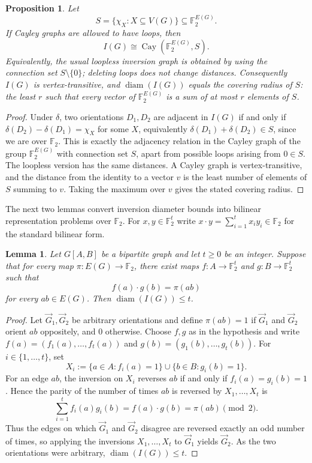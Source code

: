 \documentclass[11pt]{article}
\newtheorem{proposition}[theorem]{Proposition}
\newtheorem{lemma}[theorem]{Lemma}
\theoremstyle{remark}
\DeclareMathOperator{\diam}{diam}
\DeclareMathOperator{\Cay}{Cay}
\newcommand{\F}{\mathbb{F}}
\begin{document}
\begin{proposition}\label{prop:cayley}
Let
\[
  S=\{\chi_X:X\subseteq V(G)\}\subseteq\F_2^{E(G)}.
\]
If Cayley graphs are allowed to have loops, then
\[
  I(G)\cong \Cay(\F_2^{E(G)},S).
\]
Equivalently, the usual loopless inversion graph is obtained by using the connection set $S\setminus\{0\}$; deleting loops does not change distances.
Consequently $I(G)$ is vertex-transitive, and $\diam(I(G))$ equals the covering radius of $S$: the least $r$ such that every vector of $\F_2^{E(G)}$ is a sum of at most $r$ elements of $S$.
\end{proposition}

\begin{proof}
Under $\delta$, two orientations $D_1,D_2$ are adjacent in $I(G)$ if and only if
$\delta(D_2)-\delta(D_1)=\chi_X$ for some $X$, equivalently
$\delta(D_1)+\delta(D_2)\in S$, since we are over $\F_2$.
This is exactly the adjacency relation in the Cayley graph of the group $\F_2^{E(G)}$ with connection set $S$, apart from possible loops arising from $0\in S$.
The loopless version has the same distances.
A Cayley graph is vertex-transitive, and the distance from the identity to a vector $v$ is the least number of elements of $S$ summing to $v$.
Taking the maximum over $v$ gives the stated covering radius.
\end{proof}

The next two lemmas convert inversion diameter bounds into bilinear representation problems over $\F_2$. 
For $x,y\in\F_2^t$ write
$x\cdot y=\sum_{i=1}^t x_i y_i\in\F_2$
for the standard bilinear form.


\begin{lemma}\label{lem:bipartite-linear}
Let $G[A,B]$ be a bipartite graph and let $t\ge0$ be an integer.
Suppose that for every map $\pi:E(G)\to\F_2$,  there exist maps
$f:A\to\F_2^t$ and $g:B\to\F_2^t$ such that
\[
  f(a)\cdot g(b)=\pi(ab)
\]
for every $ab\in E(G)$.
Then $\diam(I(G))\le t$.
\end{lemma}

\begin{proof}
Let $\overrightarrow G_1,\overrightarrow G_2$ be arbitrary orientations and define $\pi(ab)=1$ if $\overrightarrow G_1$ and $\overrightarrow G_2$ orient $ab$ oppositely, and $0$ otherwise.
Choose $f,g$ as in the hypothesis and write
$f(a)=(f_1(a),\ldots,f_t(a))$ and $g(b)=(g_1(b),\ldots,g_t(b))$.
For $i\in\{1,\ldots,t\}$, set
\[
  X_i:=\{a\in A:f_i(a)=1\}\cup\{b\in B:g_i(b)=1\}.
\]
For an edge $ab$, the inversion on $X_i$ reverses $ab$ if and only if $f_i(a)=g_i(b)=1$.
Hence the parity of the number of times $ab$ is reversed by $X_1,\ldots,X_t$ is
\[
  \sum_{i=1}^t f_i(a)g_i(b)=f(a)\cdot g(b)=\pi(ab)\pmod2.
\]
Thus  the edges on which $\overrightarrow G_1$ and $\overrightarrow G_2$ disagree are reversed exactly an odd number of times, so applying the inversions $X_1,
\ldots,X_t$ to $\overrightarrow G_1$ yields $\overrightarrow G_2$.
As the two orientations were arbitrary, $\diam(I(G))\le t$.
\end{proof}
\end{document}
